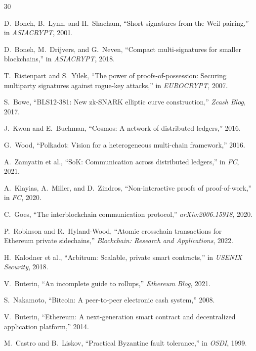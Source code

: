 \documentclass[11pt,a4paper]{article}
\begin{document}

\begin{thebibliography}{30}

D.~Boneh, B.~Lynn, and H.~Shacham, ``Short signatures from the Weil pairing,'' in \emph{ASIACRYPT}, 2001.

D.~Boneh, M.~Drijvers, and G.~Neven, ``Compact multi-signatures for smaller blockchains,'' in \emph{ASIACRYPT}, 2018.

T.~Ristenpart and S.~Yilek, ``The power of proofs-of-possession: Securing multiparty signatures against rogue-key attacks,'' in \emph{EUROCRYPT}, 2007.

S.~Bowe, ``BLS12-381: New zk-SNARK elliptic curve construction,'' \emph{Zcash Blog}, 2017.

J.~Kwon and E.~Buchman, ``Cosmos: A network of distributed ledgers,'' 2016.

G.~Wood, ``Polkadot: Vision for a heterogeneous multi-chain framework,'' 2016.

A.~Zamyatin et al., ``SoK: Communication across distributed ledgers,'' in \emph{FC}, 2021.

A.~Kiayias, A.~Miller, and D.~Zindros, ``Non-interactive proofs of proof-of-work,'' in \emph{FC}, 2020.

C.~Goes, ``The interblockchain communication protocol,'' \emph{arXiv:2006.15918}, 2020.

P.~Robinson and R.~Hyland-Wood, ``Atomic crosschain transactions for Ethereum private sidechains,'' \emph{Blockchain: Research and Applications}, 2022.

H.~Kalodner et al., ``Arbitrum: Scalable, private smart contracts,'' in \emph{USENIX Security}, 2018.

V.~Buterin, ``An incomplete guide to rollups,'' \emph{Ethereum Blog}, 2021.

S.~Nakamoto, ``Bitcoin: A peer-to-peer electronic cash system,'' 2008.

V.~Buterin, ``Ethereum: A next-generation smart contract and decentralized application platform,'' 2014.

M.~Castro and B.~Liskov, ``Practical Byzantine fault tolerance,'' in \emph{OSDI}, 1999.


\end{thebibliography}
\end{document}
